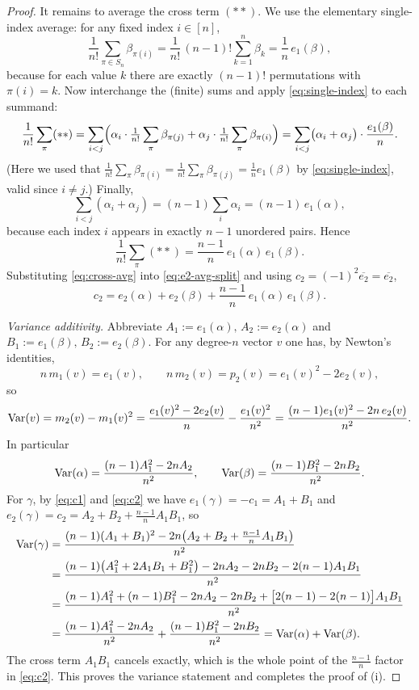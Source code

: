 \begin{proof}
It remains to average the cross term $(\ast\ast)$. We use the elementary
single-index average: for any fixed index $i\in[n]$,
\begin{equation}\label{eq:single-index}
\frac1{n!}\sum_{\pi\in S_n}\beta_{\pi(i)}
=\frac1{n!}\,(n-1)!\sum_{k=1}^n\beta_k
=\frac1n\,e_1(\beta),
\end{equation}
because for each value $k$ there are exactly $(n-1)!$ permutations with
$\pi(i)=k$. Now interchange the (finite) sums and apply \eqref{eq:single-index}
to each summand:
\[
\frac1{n!}\sum_{\pi}(\ast\ast)
=\sum_{i<j}\Bigl(\alpha_i\cdot\tfrac1{n!}\sum_\pi\beta_{\pi(j)}
+\alpha_j\cdot\tfrac1{n!}\sum_\pi\beta_{\pi(i)}\Bigr)
=\sum_{i<j}\bigl(\alpha_i+\alpha_j\bigr)\cdot\frac{e_1(\beta)}{n}.
\]
(Here we used that $\tfrac1{n!}\sum_\pi\beta_{\pi(i)}=\tfrac1{n!}\sum_\pi\beta_{\pi(j)}=\tfrac1n e_1(\beta)$
by \eqref{eq:single-index}, valid since $i\ne j$.) Finally,
\[
\sum_{i<j}(\alpha_i+\alpha_j)=(n-1)\sum_{i}\alpha_i=(n-1)\,e_1(\alpha),
\]
because each index $i$ appears in exactly $n-1$ unordered pairs. Hence
\begin{equation}\label{eq:cross-avg}
\frac1{n!}\sum_{\pi}(\ast\ast)=\frac{n-1}{n}\,e_1(\alpha)\,e_1(\beta).
\end{equation}
Substituting \eqref{eq:cross-avg} into \eqref{eq:e2-avg-split} and using
$c_2=(-1)^2\overline{e_2}=\overline{e_2}$,
\begin{equation}\label{eq:c2}
c_2=e_2(\alpha)+e_2(\beta)+\frac{n-1}{n}\,e_1(\alpha)\,e_1(\beta).
\end{equation}

\smallskip\noindent\emph{Variance additivity.}
Abbreviate $A_1:=e_1(\alpha),\,A_2:=e_2(\alpha)$ and $B_1:=e_1(\beta),\,B_2:=e_2(\beta)$.
For any degree-$n$ vector $v$ one has, by Newton's identities,
\[
n\,m_1(v)=e_1(v),\qquad n\,m_2(v)=p_2(v)=e_1(v)^2-2e_2(v),
\]
so
\[
\operatorname{Var}(v)=m_2(v)-m_1(v)^2=\frac{e_1(v)^2-2e_2(v)}{n}-\frac{e_1(v)^2}{n^2}
=\frac{(n-1)e_1(v)^2-2n\,e_2(v)}{n^2}.
\]
In particular
\[
\operatorname{Var}(\alpha)=\frac{(n-1)A_1^2-2nA_2}{n^2},\qquad
\operatorname{Var}(\beta)=\frac{(n-1)B_1^2-2nB_2}{n^2}.
\]
For $\gamma$, by \eqref{eq:c1} and \eqref{eq:c2} we have
$e_1(\gamma)=-c_1=A_1+B_1$ and $e_2(\gamma)=c_2=A_2+B_2+\tfrac{n-1}{n}A_1B_1$, so
\begin{align*}
\operatorname{Var}(\gamma)
&=\frac{(n-1)(A_1+B_1)^2-2n\bigl(A_2+B_2+\tfrac{n-1}{n}A_1B_1\bigr)}{n^2}\\
&=\frac{(n-1)\bigl(A_1^2+2A_1B_1+B_1^2\bigr)-2nA_2-2nB_2-2(n-1)A_1B_1}{n^2}\\
&=\frac{(n-1)A_1^2+(n-1)B_1^2-2nA_2-2nB_2
+\bigl[2(n-1)-2(n-1)\bigr]A_1B_1}{n^2}\\
&=\frac{(n-1)A_1^2-2nA_2}{n^2}+\frac{(n-1)B_1^2-2nB_2}{n^2}
=\operatorname{Var}(\alpha)+\operatorname{Var}(\beta).
\end{align*}
The cross term $A_1B_1$ cancels exactly, which is the whole point of the
$\tfrac{n-1}{n}$ factor in \eqref{eq:c2}. This proves the variance statement and
completes the proof of (i).


\end{proof}
